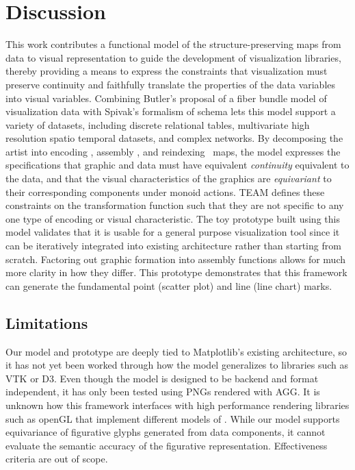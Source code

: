 \documentclass[../main.tex]{subfiles}
\begin{document}
\section{Discussion}
This work contributes a functional model of the structure-preserving maps from data to visual representation to guide the development of visualization libraries, thereby providing a means to express the constraints that visualization must preserve continuity and faithfully translate the properties of the data variables into visual variables. Combining Butler's proposal of a fiber bundle model of visualization data with Spivak's formalism of schema lets this model support a variety of datasets, including  discrete relational tables, multivariate high resolution spatio temporal datasets, and complex networks. By decomposing the artist into encoding \vchannel, assembly \vmark, and reindexing \vindex\ maps, the model expresses the specifications that graphic and data must have equivalent \textit{continuity} equivalent to the data, and that the visual characteristics of the graphics are \textit{equivariant} to their corresponding components under monoid actions. TEAM defines these constraints on the transformation function such that they are not specific to any one type of encoding or visual characteristic. The toy prototype built using this model validates that it is usable for a general purpose visualization tool since it can be iteratively integrated into existing architecture rather than starting from scratch. Factoring out graphic formation into assembly functions allows for much more clarity in how they differ. This prototype demonstrates that this framework can generate the fundamental point (scatter plot) and line (line chart) marks. 

\subsection{Limitations}
Our model and prototype are deeply tied to Matplotlib's existing architecture, so it has not yet been worked through how the model generalizes to libraries such as VTK or D3. Even though the model is designed to be backend and format independent, it has only been tested using PNGs rendered with AGG\cite{shemanarevAntiGrainGeometry}. It is unknown how this framework interfaces with high performance rendering libraries such as openGL\cite{CarsonOpenGL1997} that implement different models of \gsection. While our model supports equivariance of figurative glyphs \cite{byrneAcquiredCodesMeaning2016} generated from data components\cite{beckfeathers2014,byrneFigurativeFramesCritical2017}, it cannot evaluate the semantic accuracy of the figurative representation. Effectiveness criteria\cite{mackinlayAutomaticDesignGraphical1987,chambersGraphicalMethodsData1983a} are out of scope.
\end{document}
